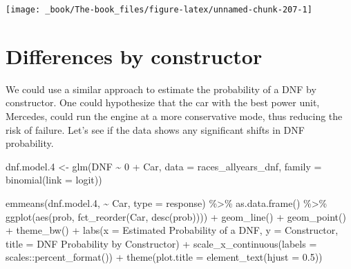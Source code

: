 \documentclass[
]{book}
\newenvironment{Shaded}{\begin{snugshade}}{\end{snugshade}}
\newcommand{\AttributeTok}[1]{\textcolor[rgb]{0.77,0.63,0.00}{#1}}
\newcommand{\DecValTok}[1]{\textcolor[rgb]{0.00,0.00,0.81}{#1}}
\newcommand{\FloatTok}[1]{\textcolor[rgb]{0.00,0.00,0.81}{#1}}
\newcommand{\FunctionTok}[1]{\textcolor[rgb]{0.00,0.00,0.00}{#1}}
\newcommand{\NormalTok}[1]{#1}
\newcommand{\OtherTok}[1]{\textcolor[rgb]{0.56,0.35,0.01}{#1}}
\newcommand{\SpecialCharTok}[1]{\textcolor[rgb]{0.00,0.00,0.00}{#1}}
\newcommand{\StringTok}[1]{\textcolor[rgb]{0.31,0.60,0.02}{#1}}
\begin{document}
\begin{center}\texttt{[image: \_book/The-book\_files/figure-latex/unnamed-chunk-207-1]} \end{center}

\hypertarget{differences-by-constructor}{%
\section{Differences by constructor}\label{differences-by-constructor}}

We could use a similar approach to estimate the probability of a DNF by constructor. One could hypothesize that the car with the best power unit, Mercedes, could run the engine at a more conservative mode, thus reducing the risk of failure. Let's see if the data shows any significant shifts in DNF probability.

\begin{Shaded}
\begin{Highlighting}[]
\NormalTok{dnf.model}\FloatTok{.4} \OtherTok{\textless{}{-}} \FunctionTok{glm}\NormalTok{(DNF }\SpecialCharTok{\textasciitilde{}} \DecValTok{0} \SpecialCharTok{+}\NormalTok{ Car, }\AttributeTok{data =}\NormalTok{ races\_allyears\_dnf,}
                   \AttributeTok{family =} \FunctionTok{binomial}\NormalTok{(}\AttributeTok{link =} \StringTok{\textquotesingle{}logit\textquotesingle{}}\NormalTok{))}
\end{Highlighting}
\end{Shaded}

\begin{Shaded}
\begin{Highlighting}[]
\FunctionTok{emmeans}\NormalTok{(dnf.model}\FloatTok{.4}\NormalTok{, }\SpecialCharTok{\textasciitilde{}}\NormalTok{ Car, }\AttributeTok{type =} \StringTok{\textquotesingle{}response\textquotesingle{}}\NormalTok{) }\SpecialCharTok{\%\textgreater{}\%} 
  \FunctionTok{as.data.frame}\NormalTok{() }\SpecialCharTok{\%\textgreater{}\%} 
  \FunctionTok{ggplot}\NormalTok{(}\FunctionTok{aes}\NormalTok{(prob, }\FunctionTok{fct\_reorder}\NormalTok{(Car, }\FunctionTok{desc}\NormalTok{(prob)))) }\SpecialCharTok{+}
  \FunctionTok{geom\_line}\NormalTok{() }\SpecialCharTok{+}
  \FunctionTok{geom\_point}\NormalTok{() }\SpecialCharTok{+} 
  \FunctionTok{theme\_bw}\NormalTok{() }\SpecialCharTok{+}
  \FunctionTok{labs}\NormalTok{(}\AttributeTok{x =} \StringTok{\textquotesingle{}Estimated Probability of a DNF\textquotesingle{}}\NormalTok{,}
       \AttributeTok{y =} \StringTok{\textquotesingle{}Constructor\textquotesingle{}}\NormalTok{,}
       \AttributeTok{title =} \StringTok{\textquotesingle{}DNF Probability by Constructor\textquotesingle{}}\NormalTok{) }\SpecialCharTok{+}
\FunctionTok{scale\_x\_continuous}\NormalTok{(}\AttributeTok{labels =}\NormalTok{ scales}\SpecialCharTok{::}\FunctionTok{percent\_format}\NormalTok{()) }\SpecialCharTok{+}
  \FunctionTok{theme}\NormalTok{(}\AttributeTok{plot.title =} \FunctionTok{element\_text}\NormalTok{(}\AttributeTok{hjust =} \FloatTok{0.5}\NormalTok{))}
\end{Highlighting}
\end{Shaded}
\end{document}
